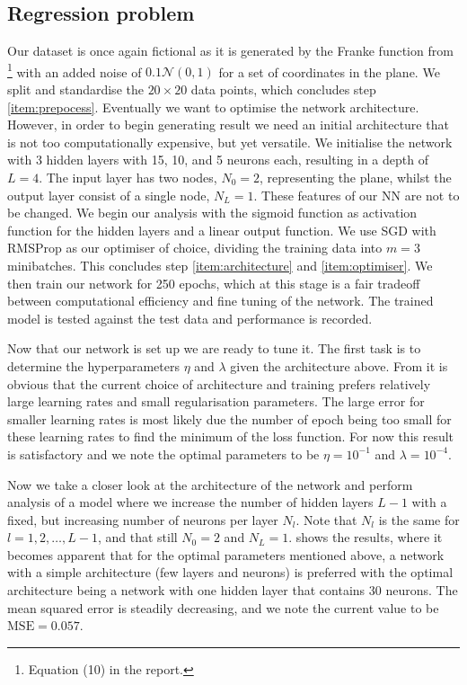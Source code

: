 \subsection{Regression problem}\label{sec:analysis_regression}


    Our dataset is once again fictional as it is generated by the Franke function from \projectOne\footnote{Equation (10) in the report.} with an added noise of $0.1 \mathcal{N}(0, 1)$ for a set of coordinates in the plane. We split and standardise the $20\times 20$ data points, which concludes step \ref{item:prepocess}. 
    Eventually we want to optimise the network architecture. However, in order to begin generating result we need an initial architecture that is not too computationally expensive, but yet versatile. We initialise the network with 3 hidden layers with 15, 10, and 5 neurons each, resulting in a depth of $L=4$. The input layer has two nodes, $N_0=2$, representing the plane, whilst the output layer consist of a single node, $N_L=1$. These features of our NN are not to be changed. We begin our analysis with the sigmoid function as activation function for the hidden layers and a linear output function. We use SGD with RMSProp as our optimiser of choice, dividing the training data into $m=3$ minibatches. This concludes step \ref{item:architecture} and \ref{item:optimiser}.
    We then train our network for 250 epochs, which at this stage is a fair tradeoff between computational efficiency and fine tuning of the network. The trained model is tested against the test data and performance is recorded. 

    Now that our network is set up we are ready to tune it. The first task is to determine the hyperparameters $\eta$ and $\lambda$ given the architecture above. From  it is obvious that the current choice of architecture and training prefers relatively large learning rates and small regularisation parameters. The large error for smaller learning rates is most likely due the number of epoch being too small for these learning rates to find the minimum of the loss function. For now this result is satisfactory and we note the optimal parameters to be $\eta=10^{-1}$ and $\lambda=10^{-4}$. 

    Now we take a closer look at the architecture of the network and perform analysis of a model where we increase the number of hidden layers $L-1$ with a fixed, but increasing number of neurons per layer $N_l$. Note that $N_l$ is the same for $l=1,2, \dots, L-1$, and that still $N_0=2$ and $N_L=1$.  shows the results, where it becomes apparent that for the optimal parameters mentioned above, a network with a simple architecture (few layers and neurons) is preferred with the optimal architecture being a network with one hidden layer that contains 30 neurons. The mean squared error is steadily decreasing, and we note the current value to be $\mathrm{MSE} = 0.057$. 

